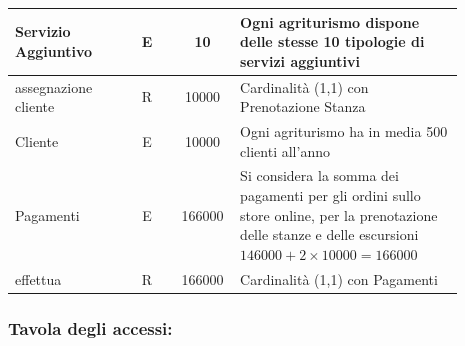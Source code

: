 \documentclass[12pt,a4paper]{article}
\begin{document}
\begin{center}
\begin{longtable}{|p{0.23\linewidth}|p{0.1\linewidth}|p{0.11\linewidth}|p{0.45\linewidth}|}
\hline
Servizio Aggiuntivo
 & 
\multicolumn{1}{|c|}{E}
 & 
\multicolumn{1}{|c|}{10}
 & 
Ogni agriturismo dispone delle stesse 10 tipologie di servizi aggiuntivi
\\

\hline
assegnazione cliente
 & 
\multicolumn{1}{|c|}{R}
 & 
\multicolumn{1}{|c|}{10000}
 & 
Cardinalità (1,1) con Prenotazione Stanza
\\

\hline
Cliente
 & 
\multicolumn{1}{|c|}{E}
 & 
\multicolumn{1}{|c|}{10000}
 & 
Ogni agriturismo ha in media 500 clienti all'anno
\\

\hline

Pagamenti
 & 
\multicolumn{1}{|c|}{E}
 & 
\multicolumn{1}{|c|}{166000}
 & 
Si considera la somma dei pagamenti per gli ordini sullo store online, per la prenotazione delle stanze e delle escursioni $146000+2\times 10000= 166000$
\\

\hline
effettua
 & 
\multicolumn{1}{|c|}{R}
 & 
\multicolumn{1}{|c|}{166000}
 & 
Cardinalità (1,1) con Pagamenti
\\

\hline

\end{longtable}\end{center}
\pagebreak
\subsubsection*{Tavola degli accessi:}
\end{document}

